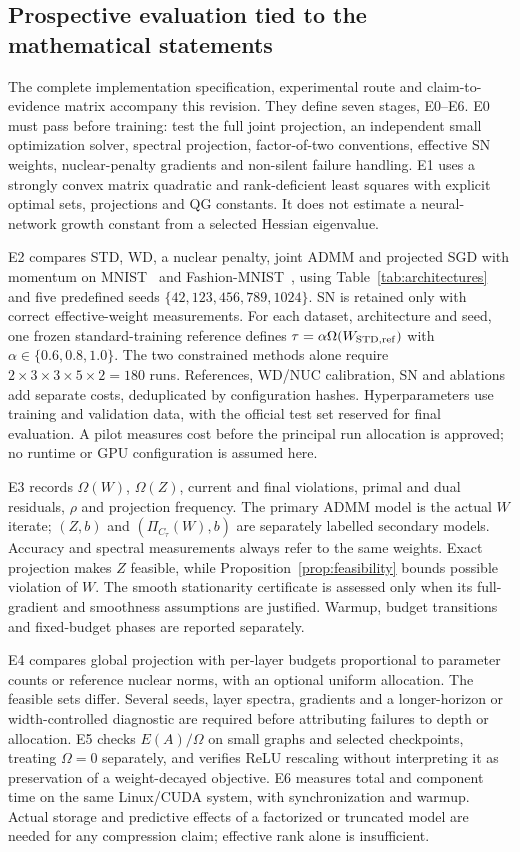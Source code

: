 \subsection{Prospective evaluation tied to the mathematical statements}
The complete implementation specification, experimental route and claim-to-evidence matrix accompany this revision. They define seven stages, E0--E6. E0 must pass before training: test the full joint projection, an independent small optimization solver, spectral projection, factor-of-two conventions, effective SN weights, nuclear-penalty gradients and non-silent failure handling. E1 uses a strongly convex matrix quadratic and rank-deficient least squares with explicit optimal sets, projections and QG constants. It does not estimate a neural-network growth constant from a selected Hessian eigenvalue.

E2 compares STD, WD, a nuclear penalty, joint ADMM and projected SGD with momentum on MNIST~\cite{lecun1998gradient} and Fashion-MNIST~\cite{Xiao2017FashionMNIST}, using Table~\ref{tab:architectures} and five predefined seeds $\{42,123,456,789,1024\}$. SN is retained only with correct effective-weight measurements. For each dataset, architecture and seed, one frozen standard-training reference defines $\tau=\alpha\Omega(W_{\rm STD,ref})$ with $\alpha\in\{0.6,0.8,1.0\}$. The two constrained methods alone require $2\times3\times3\times5\times2=180$ runs. References, WD/NUC calibration, SN and ablations add separate costs, deduplicated by configuration hashes. Hyperparameters use training and validation data, with the official test set reserved for final evaluation. A pilot measures cost before the principal run allocation is approved; no runtime or GPU configuration is assumed here.

E3 records $\Omega(W)$, $\Omega(Z)$, current and final violations, primal and dual residuals, $\rho$ and projection frequency. The primary ADMM model is the actual $W$ iterate; $(Z,b)$ and $(\Pi_{C_\tau}(W),b)$ are separately labelled secondary models. Accuracy and spectral measurements always refer to the same weights. Exact projection makes $Z$ feasible, while Proposition~\ref{prop:feasibility} bounds possible violation of $W$. The smooth stationarity certificate is assessed only when its full-gradient and smoothness assumptions are justified. Warmup, budget transitions and fixed-budget phases are reported separately.

E4 compares global projection with per-layer budgets proportional to parameter counts or reference nuclear norms, with an optional uniform allocation. The feasible sets differ. Several seeds, layer spectra, gradients and a longer-horizon or width-controlled diagnostic are required before attributing failures to depth or allocation. E5 checks $E(A)/\Omega$ on small graphs and selected checkpoints, treating $\Omega=0$ separately, and verifies ReLU rescaling without interpreting it as preservation of a weight-decayed objective. E6 measures total and component time on the same Linux/CUDA system, with synchronization and warmup. Actual storage and predictive effects of a factorized or truncated model are needed for any compression claim; effective rank alone is insufficient.

